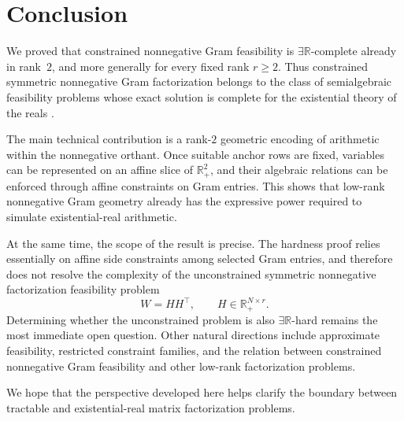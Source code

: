 \documentclass[11pt]{article}
\begin{document}
\section{Conclusion}
\label{sec:conclusion}

We proved that constrained nonnegative Gram feasibility is
$\exists\mathbb{R}$-complete already in rank~$2$, and more generally for every
fixed rank $r\ge 2$. Thus constrained symmetric nonnegative Gram factorization
belongs to the class of semialgebraic feasibility problems whose exact solution
is complete for the existential theory of the reals
\cite{schaefer2010complexity,cardinal2013survey}.

The main technical contribution is a rank-$2$ geometric encoding of arithmetic
within the nonnegative orthant. Once suitable anchor rows are fixed, variables
can be represented on an affine slice of $\mathbb{R}_+^2$, and their algebraic
relations can be enforced through affine constraints on Gram entries. This
shows that low-rank nonnegative Gram geometry already has the expressive power
required to simulate existential-real arithmetic.

At the same time, the scope of the result is precise. The hardness proof relies
essentially on affine side constraints among selected Gram entries, and
therefore does not resolve the complexity of the unconstrained symmetric
nonnegative factorization feasibility problem
\[
W = HH^\top, \qquad H \in \mathbb{R}_+^{N\times r}.
\]
Determining whether the unconstrained problem is also
$\exists\mathbb{R}$-hard remains the most immediate open question. Other
natural directions include approximate feasibility, restricted constraint
families, and the relation between constrained nonnegative Gram feasibility and
other low-rank factorization problems.

We hope that the perspective developed here helps clarify the boundary between
tractable and existential-real matrix factorization problems.

\printbibliography
\end{document}

